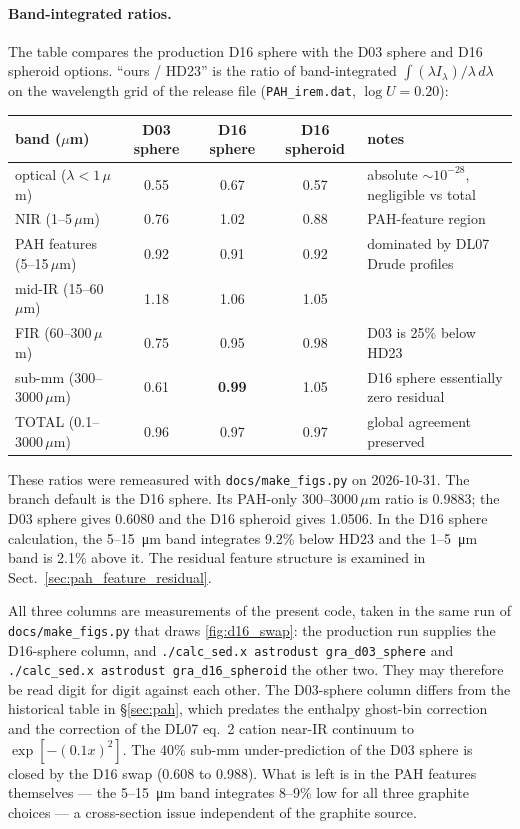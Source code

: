 \documentclass{my_memo}
\begin{document}
\paragraph{Band-integrated ratios.} The table compares the
production D16 sphere with the D03 sphere and D16 spheroid options. ``ours / HD23'' is the
ratio of band-integrated $\int (\lambda I_\lambda)/\lambda \, d\lambda$
on the wavelength grid of the release file (\texttt{PAH\_irem.dat},
$\log U = 0.20$):

\begin{tabularx}{0.95\textwidth}{l c c c X}
\toprule
band ($\mu$m) & D03 sphere & D16 sphere & D16 spheroid & notes \\
\midrule
optical ($\lambda < 1$\,$\mu$m)         & 0.55 & 0.67 & 0.57 & absolute $\sim 10^{-28}$, negligible vs total \\
NIR (1--5\,$\mu$m)                      & 0.76 & 1.02 & 0.88 & PAH-feature region \\
PAH features (5--15\,$\mu$m)            & 0.92 & 0.91 & 0.92 & dominated by DL07 Drude profiles \\
mid-IR (15--60\,$\mu$m)                 & 1.18 & 1.06 & 1.05 & \\
FIR (60--300\,$\mu$m)                   & 0.75 & 0.95 & 0.98 & D03 is 25\% below HD23 \\
sub-mm (300--3000\,$\mu$m)              & 0.61 & \textbf{0.99} & 1.05 & D16 sphere essentially zero residual \\
TOTAL (0.1--3000\,$\mu$m)               & 0.96 & 0.97 & 0.97 & global agreement preserved \\
\bottomrule
\end{tabularx}

\medskip
\noindent These ratios were remeasured with
\texttt{docs/make\_figs.py} on 2026-10-31. The branch default is the
D16 sphere. Its PAH-only 300--3000\,$\mu$m ratio is 0.9883; the D03
sphere gives 0.6080 and the D16 spheroid gives 1.0506. In the D16
sphere calculation, the 5--\SI{15}{\micro\meter} band integrates
9.2\% below HD23 and the 1--\SI{5}{\micro\meter} band is 2.1\% above
it. The residual feature structure is examined in
Sect.~\ref{sec:pah_feature_residual}.

All three columns are measurements of the present code, taken in the
same run of \texttt{docs/make\_figs.py} that draws
\autoref{fig:d16_swap}: the production run supplies the D16-sphere
column, and \texttt{./calc\_sed.x astrodust gra\_d03\_sphere} and
\texttt{./calc\_sed.x astrodust gra\_d16\_spheroid} the other two. They
may therefore be read digit for digit against each other. The
D03-sphere column differs from the historical table in \S\ref{sec:pah},
which predates the enthalpy ghost-bin correction and the correction of
the DL07 eq.~2 cation near-IR continuum to $\exp[-(0.1x)^2]$. The 40\%
sub-mm under-prediction of the D03 sphere is closed by the D16 swap
(0.608 to 0.988). What is left is in the PAH features themselves --- the
5--\SI{15}{\micro\meter} band integrates 8--9\% low for all three
graphite choices --- a cross-section issue independent of the graphite
source.
\end{document}
